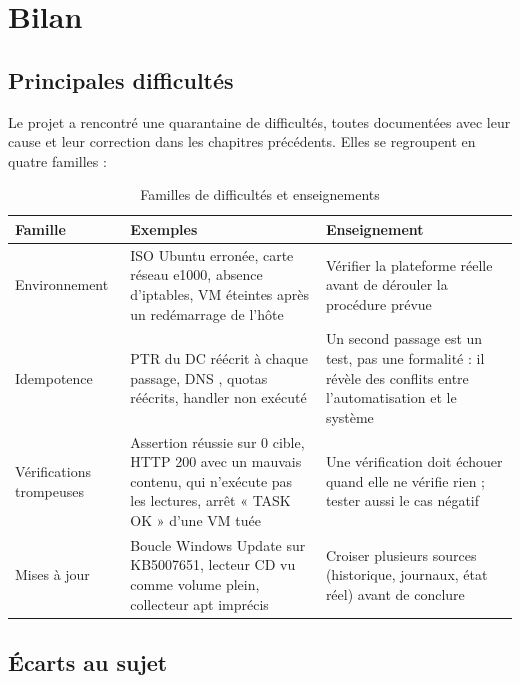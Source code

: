 \chapter{Bilan}\label{chap:bilan}

\section{Principales difficultés}

Le projet a rencontré une quarantaine de difficultés, toutes documentées avec leur cause et leur
correction dans les chapitres précédents. Elles se regroupent en quatre familles :

\begin{table}[H]
\centering
\caption{Familles de difficultés et enseignements}\label{tab:difficultes}
\begin{tabularx}{\linewidth}{@{}P{3.3cm}P{5.2cm}L@{}}
\toprule
\textbf{Famille} & \textbf{Exemples} & \textbf{Enseignement} \\
\midrule
Environnement & ISO Ubuntu erronée, carte réseau e1000, absence d'iptables, VM éteintes après un redémarrage de l'hôte & Vérifier la plateforme réelle avant de dérouler la procédure prévue \\
Idempotence & PTR du DC réécrit à chaque passage, DNS , quotas réécrits, handler non exécuté & Un second passage est un test, pas une formalité : il révèle des conflits entre l'automatisation et le système \\
Vérifications trompeuses & Assertion réussie sur 0 cible, HTTP 200 avec un mauvais contenu,  qui n'exécute pas les lectures, arrêt « TASK OK » d'une VM tuée & Une vérification doit échouer quand elle ne vérifie rien ; tester aussi le cas négatif \\
Mises à jour & Boucle Windows Update sur KB5007651, lecteur CD vu comme volume plein, collecteur apt imprécis & Croiser plusieurs sources (historique, journaux, état réel) avant de conclure \\
\bottomrule
\end{tabularx}
\end{table}

\section{Écarts au sujet}


